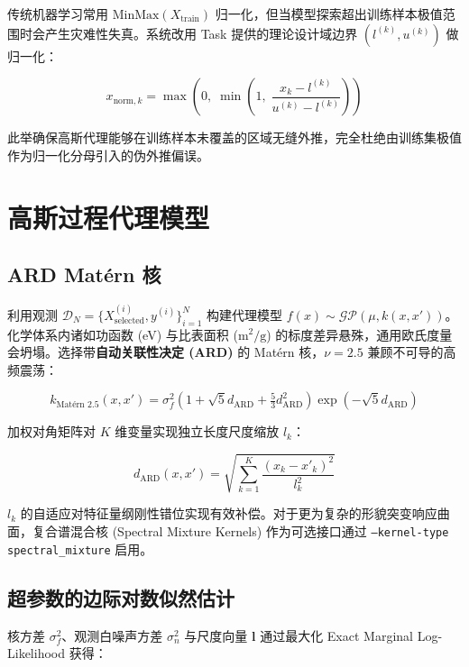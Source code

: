 \documentclass[12pt,a4paper]{article}
\begin{document}
传统机器学习常用 $\text{MinMax}(X_{\text{train}})$ 归一化，但当模型探索超出训练样本极值范围时会产生灾难性失真。系统改用 Task 提供的理论设计域边界 $(l^{(k)}, u^{(k)})$ 做归一化：

\begin{equation}
    x_{\text{norm}, k} = \max \left( 0, \;\min \left( 1, \; \frac{x_k - l^{(k)}}{u^{(k)} - l^{(k)}} \right) \right)
\end{equation}

此举确保高斯代理能够在训练样本未覆盖的区域无缝外推，完全杜绝由训练集极值作为归一化分母引入的伪外推偏误。


\section{高斯过程代理模型}

\subsection{ARD Mat\'{e}rn 核}

利用观测 $\mathcal{D}_N = \{X_{\text{selected}}^{(i)}, y^{(i)}\}_{i=1}^N$ 构建代理模型 $f(x) \sim \mathcal{GP}(\mu, k(x, x'))$。化学体系内诸如功函数 (eV) 与比表面积 ($\text{m}^2/\text{g}$) 的标度差异悬殊，通用欧氏度量会坍塌。选择带\textbf{自动关联性决定 (ARD)} 的 Mat\'{e}rn 核，$\nu = 2.5$ 兼顾不可导的高频震荡：

\begin{equation}
    k_{\text{Mat\'{e}rn } 2.5}(x, x') = \sigma_f^2 \left( 1 + \sqrt{5} d_{\text{ARD}} + \tfrac{5}{3} d_{\text{ARD}}^2 \right) \exp\left( -\sqrt{5} d_{\text{ARD}} \right)
\end{equation}

加权对角矩阵对 $K$ 维变量实现独立长度尺度缩放 $l_k$：

\begin{equation}
    d_{\text{ARD}}(x, x') = \sqrt{ \sum_{k=1}^K \frac{(x_k - x'_k)^2}{l_k^2} }
\end{equation}

$l_k$ 的自适应对特征量纲刚性错位实现有效补偿。对于更为复杂的形貌突变响应曲面，复合谱混合核 (Spectral Mixture Kernels)\cite{catbox2025} 作为可选接口通过 \texttt{--kernel-type spectral\_mixture} 启用。

\subsection{超参数的边际对数似然估计}

核方差 $\sigma_f^2$、观测白噪声方差 $\sigma_n^2$ 与尺度向量 $\mathbf{l}$ 通过最大化 Exact Marginal Log-Likelihood 获得：
\end{document}
